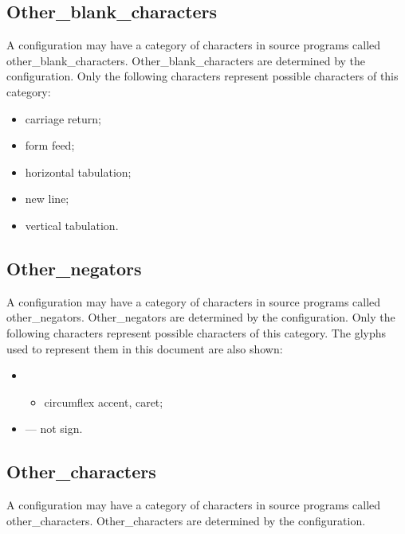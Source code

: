 \hypertarget{other_blank_characters}{%
\subsection{Other\_blank\_characters}\label{other_blank_characters}}

A configuration may have a category of characters in source programs
called other\_blank\_characters. Other\_blank\_characters are determined
by the configuration. Only the following characters represent possible
characters of this category:

\begin{itemize}
\item
  carriage return;
\item
  form feed;
\item
  horizontal tabulation;
\item
  new line;
\item
  vertical tabulation.
\end{itemize}

\hypertarget{other_negators}{%
\subsection{Other\_negators}\label{other_negators}}

A configuration may have a category of characters in source programs
called other\_negators. Other\_negators are determined by the
configuration. Only the following characters represent possible
characters of this category. The glyphs used to represent them in this
document are also shown:

\begin{itemize}
\item
  \begin{itemize}
  \tightlist
  \item
    circumflex accent, caret;
  \end{itemize}
\item
  --- not sign.
\end{itemize}

\hypertarget{other_characters}{%
\subsection{Other\_characters}\label{other_characters}}

A configuration may have a category of characters in source programs
called other\_characters. Other\_characters are determined by the
configuration.

